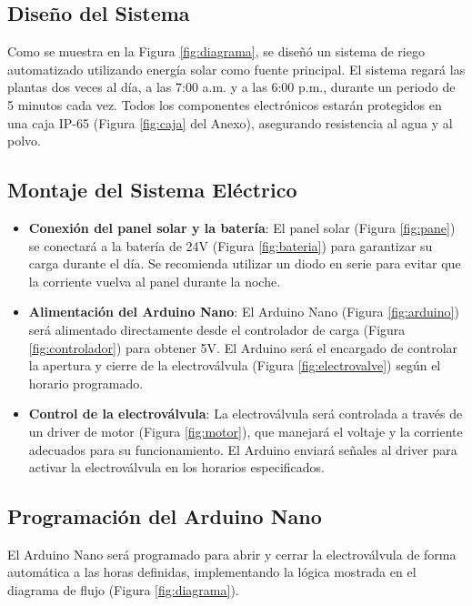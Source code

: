\documentclass[12pt]{article}
\begin{document}
\subsection{Diseño del Sistema}
Como se muestra en la Figura \ref{fig:diagrama}, se diseñó un sistema de riego automatizado utilizando energía solar como fuente principal. El sistema regará las plantas dos veces al día, a las 7:00 a.m. y a las 6:00 p.m., durante un periodo de 5 minutos cada vez. Todos los componentes electrónicos estarán protegidos en una caja IP-65 (Figura \ref{fig:caja} del Anexo), asegurando resistencia al agua y al polvo.

\subsection{Montaje del Sistema Eléctrico}
\begin{itemize}
      \item \textbf{Conexión del panel solar y la batería}: El panel solar (Figura \ref{fig:pane}) se conectará a la batería de 24V (Figura \ref{fig:bateria}) para garantizar su carga durante el día. Se recomienda utilizar un diodo en serie para evitar que la corriente vuelva al panel durante la noche.

      \item \textbf{Alimentación del Arduino Nano}: El Arduino Nano (Figura \ref{fig:arduino}) será alimentado directamente desde el controlador de carga (Figura \ref{fig:controlador}) para obtener 5V. El Arduino será el encargado de controlar la apertura y cierre de la electroválvula (Figura \ref{fig:electrovalve}) según el horario programado.

      \item \textbf{Control de la electroválvula}: La electroválvula será controlada a través de un driver de motor (Figura \ref{fig:motor}), que manejará el voltaje y la corriente adecuados para su funcionamiento. El Arduino enviará señales al driver para activar la electroválvula en los horarios especificados.
\end{itemize}

\subsection{Programación del Arduino Nano}
El Arduino Nano será programado para abrir y cerrar la electroválvula de forma automática a las horas definidas, implementando la lógica mostrada en el diagrama de flujo (Figura \ref{fig:diagrama}).
\end{document}

